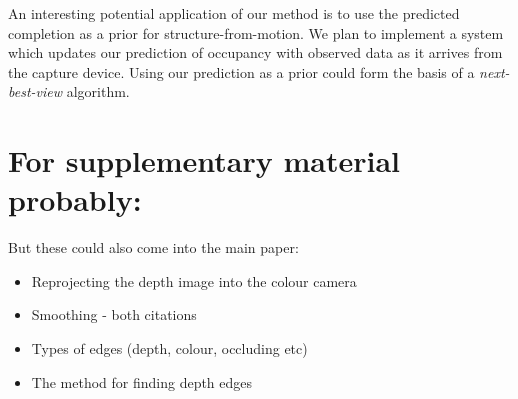\documentclass[10pt,twocolumn,letterpaper]{article}
\newcommand{\todo}[1]{\textcolor{red}{TODO: #1}}
\begin{document}
An interesting potential application of our method is to use the predicted completion as a prior for structure-from-motion.
We plan to implement a system which updates our prediction of occupancy with observed data as it arrives from the capture device.
Using our prediction as a prior could form the basis of a \emph{next-best-view} algorithm.

\section{For supplementary material probably:}
But these could also come into the main paper:
\begin{itemize}
\item Reprojecting the depth image into the colour camera
\item Smoothing - both citations
\item Types of edges (depth, colour, occluding etc)
\item The method for finding depth edges
\end{itemize}



{\small


}

\end{document}
